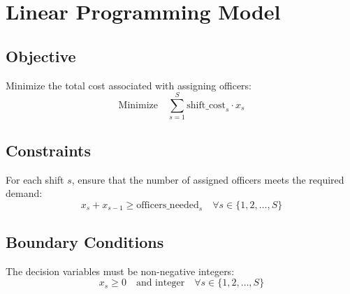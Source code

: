 \documentclass{article}
\begin{document}
\section*{Linear Programming Model}

\subsection*{Objective}

Minimize the total cost associated with assigning officers:
\[
\text{Minimize} \quad \sum_{s=1}^{S} \text{shift\_cost}_s \cdot x_s
\]

\subsection*{Constraints}

For each shift \( s \), ensure that the number of assigned officers meets the required demand:
\[
x_s + x_{s-1} \geq \text{officers\_needed}_s \quad \forall s \in \{1, 2, \ldots, S\}
\]

\subsection*{Boundary Conditions}
The decision variables must be non-negative integers:
\[
x_s \geq 0 \quad \text{and integer} \quad \forall s \in \{1, 2, \ldots, S\}
\]
\end{document}
